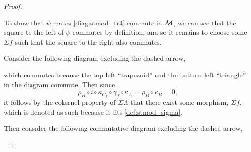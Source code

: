 \begin{proof}
\begin{enumerate}[label={(\bfseries TR\arabic*)}]
{            To show that \( \psi \) makes \autoref{diag:stmod_tr4} commute in \( {\mathcal{M}} \), we can see that the square to the left of \( \psi \) commutes by definition, and so it remains to choose some \( \Sigma f \) such that the square to the right also commutes.

            Consider the following diagram excluding the dashed arrow,
            \begin{center}
            \end{center}
            which commutes because the top left ``trapezoid'' and the bottom left ``triangle'' in the diagram commute. Then since
            \[
                \rho_B \circ i \circ \kappa_{C_f} \circ \gamma_f \circ \kappa_A = \rho_B \circ \kappa_B = 0,
            \]
            it follows by the cokernel property of \( \Sigma A \) that there exist some morphism, \( \Sigma f \), which is denoted as such because it fits \autoref{def:stmod_sigma}.

            Then consider the following commutative diagram excluding the dashed arrow,
            \begin{center}
\end{center}}
\end{enumerate}
\end{proof}
